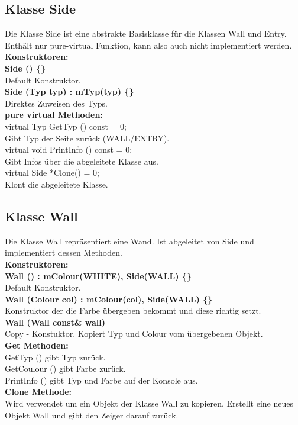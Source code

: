 \documentclass[12pt,a4paper]{article}
\begin{document}
\subsection {Klasse Side} 
Die Klasse Side ist eine abstrakte Basisklasse für die Klassen Wall und Entry. Enthält nur pure-virtual Funktion, kann also auch nicht implementiert werden. \\

\textbf {Konstruktoren:} \\
\textbf {Side () \{\}} \\
Default Konstruktor. \\
\textbf {Side (Typ typ) : mTyp(typ) \{\}} \\
Direktes Zuweisen des Typs. \\
\textbf {pure virtual Methoden:} \\
virtual Typ GetTyp () const = 0; \\
Gibt Typ der Seite zurück (WALL/ENTRY). \\
virtual void PrintInfo () const = 0; \\
Gibt Infos über die abgeleitete Klasse aus. \\
virtual Side *Clone() = 0; \\
Klont die abgeleitete Klasse. \\

\subsection {Klasse Wall} 
Die Klasse Wall repräsentiert eine Wand. Ist abgeleitet von Side und implementiert dessen Methoden. \\

\textbf {Konstruktoren:} \\
\textbf {Wall () : mColour(WHITE), Side(WALL) \{\}}\\
Default Konstruktor.\\
\textbf {Wall (Colour col) : mColour(col), Side(WALL) \{\}} \\
Konstruktor der die Farbe übergeben bekommt und diese richtig setzt. \\
\textbf {Wall (Wall const\& wall)} \\
Copy - Konstuktor. Kopiert Typ und Colour vom übergebenen Objekt. \\
\textbf {Get Methoden:} \\
GetTyp () gibt Typ zurück. \\
GetCoulour () gibt Farbe zurück. \\
PrintInfo () gibt Typ und Farbe auf der Konsole aus. \\
\textbf {Clone Methode:} \\
Wird verwendet um ein Objekt der Klasse Wall zu kopieren. Erstellt eine neues Objekt Wall und gibt den Zeiger darauf zurück. \\
\end{document}
